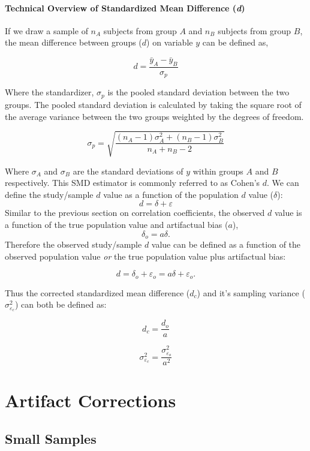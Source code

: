 \documentclass[
  letterpaper,
  DIV=11,
  numbers=noendperiod]{scrreprt}
\begin{document}
\hypertarget{technical-overview-of-standardized-mean-difference-d}{%
\subsection{\texorpdfstring{Technical Overview of Standardized Mean
Difference
(\emph{d})}{Technical Overview of Standardized Mean Difference (d)}}\label{technical-overview-of-standardized-mean-difference-d}}

If we draw a sample of \(n_A\) subjects from group \(A\) and \(n_B\)
subjects from group \(B\), the mean difference between groups (\(d\)) on
variable \(y\) can be defined as,

\[
d=\frac{\bar{y}_A - \bar{y}_B}{\sigma_p}
\]

Where the standardizer, \(\sigma_p\) is the pooled standard deviation
between the two groups. The pooled standard deviation is calculated by
taking the square root of the average variance between the two groups
weighted by the degrees of freedom.

\[
\sigma_p=\sqrt{\frac{(n_A-1)\sigma^2_{A} + (n_B-1)\sigma^2_{B}}{n_A + n_B - 2}}
\]

Where \(\sigma_{A}\) and \(\sigma_{B}\) are the standard deviations of
\(y\) within groups \(A\) and \(B\) respectively. This SMD estimator is
commonly referred to as Cohen's \(d\). We can define the study/sample
\(d\) value as a function of the population \(d\) value (\(\delta\)): \[
d = \delta + \varepsilon
\] Similar to the previous section on correlation coefficients, the
observed \(d\) value is a function of the true population value and
artifactual bias (\(a\)), \[
\delta_o = a\delta.
\] Therefore the observed study/sample \(d\) value can be defined as a
function of the observed population value \emph{or} the true population
value plus artifactual bias:

\[
d = \delta_o + \varepsilon_o = a\delta + \varepsilon_o.
\]

Thus the corrected standardized mean difference (\(d_c\)) and it's
sampling variance (\(\sigma^2_{\varepsilon_c}\)) can both be defined as:

\[
d_c = \frac{d_o}{a}
\]

\[
\sigma^2_{\varepsilon_c} = \frac{\sigma^2_{\varepsilon_o}}{a^2}
\]

\part{Artifact Corrections}

\hypertarget{small-samples}{%
\chapter{Small Samples}\label{small-samples}}
\end{document}
